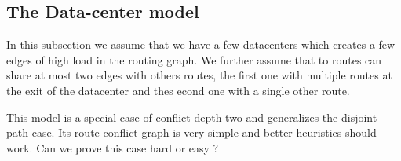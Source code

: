 \documentclass{article}
\begin{document}
{\subsection{The Data-center model}

In this subsection we assume that we have a few datacenters which creates a few edges of high load
in the routing graph. We further assume that to routes can share at most two edges with others
routes, the first one with multiple routes at the exit of the datacenter and thes econd one 
with a single other route.

This model is a special case of conflict depth two and generalizes the disjoint path case.
Its route conflict graph is very simple and better heuristics should work. Can we prove this case
hard or easy ?


}
\end{document}
